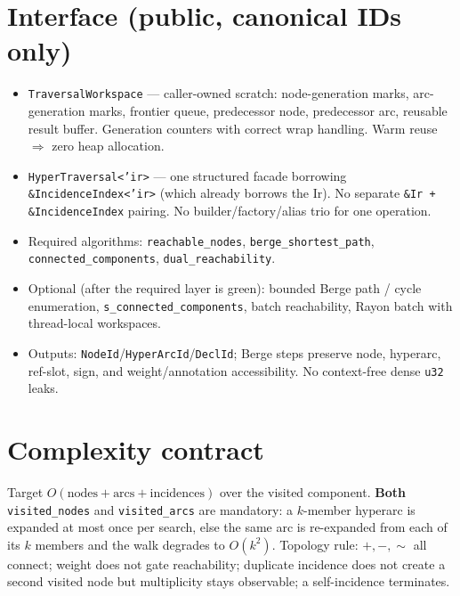 \documentclass[11pt]{article}
\begin{document}
\section{Interface (public, canonical IDs only)}
\begin{itemize}[nosep]
  \item \texttt{TraversalWorkspace} --- caller-owned scratch: node-generation marks, arc-generation
        marks, frontier queue, predecessor node, predecessor arc, reusable result buffer. Generation
        counters with correct wrap handling. Warm reuse $\Rightarrow$ zero heap allocation.
  \item \texttt{HyperTraversal<'ir>} --- one structured facade borrowing \texttt{\&IncidenceIndex<'ir>}
        (which already borrows the Ir). No separate \texttt{\&Ir + \&IncidenceIndex} pairing. No
        builder/factory/alias trio for one operation.
  \item Required algorithms: \texttt{reachable\_nodes}, \texttt{berge\_shortest\_path},
        \texttt{connected\_components}, \texttt{dual\_reachability}.
  \item Optional (after the required layer is green): bounded Berge path / cycle enumeration,
        \texttt{s\_connected\_components}, batch reachability, Rayon batch with thread-local workspaces.
  \item Outputs: \texttt{NodeId}/\texttt{HyperArcId}/\texttt{DeclId}; Berge steps preserve node, hyperarc,
        ref-slot, sign, and weight/annotation accessibility. No context-free dense \texttt{u32} leaks.
\end{itemize}

\section{Complexity contract}
Target $O(\text{nodes}+\text{arcs}+\text{incidences})$ over the visited component. \textbf{Both}
\texttt{visited\_nodes} and \texttt{visited\_arcs} are mandatory: a $k$-member hyperarc is expanded at
most once per search, else the same arc is re-expanded from each of its $k$ members and the walk
degrades to $O(k^2)$. Topology rule: $+,-,\sim$ all connect; weight does not gate reachability;
duplicate incidence does not create a second visited node but multiplicity stays observable; a
self-incidence terminates.
\end{document}
